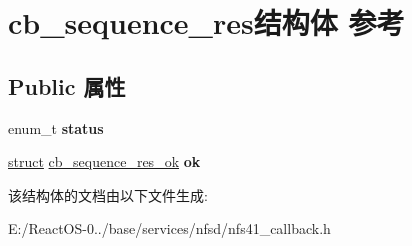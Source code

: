 \hypertarget{structcb__sequence__res}{}\section{cb\+\_\+sequence\+\_\+res结构体 参考}
\label{structcb__sequence__res}
\subsection*{Public 属性}
\begin{DoxyCompactItemize}
\item 
\mbox{\label{structcb__sequence__res_a8001c056f6214046571939a5f236b51a}} 
enum\+\_\+t {\bfseries status}
\item 
\mbox{\label{structcb__sequence__res_a25a62433a21acbf1afc4465cd27d89fb}} 
\hyperlink{interfacestruct}{struct} \hyperlink{structcb__sequence__res__ok}{cb\+\_\+sequence\+\_\+res\+\_\+ok} {\bfseries ok}
\end{DoxyCompactItemize}


该结构体的文档由以下文件生成\+:\begin{DoxyCompactItemize}
\item 
E\+:/\+React\+O\+S-\/0../base/services/nfsd/nfs41\+\_\+callback.\+h\end{DoxyCompactItemize}
